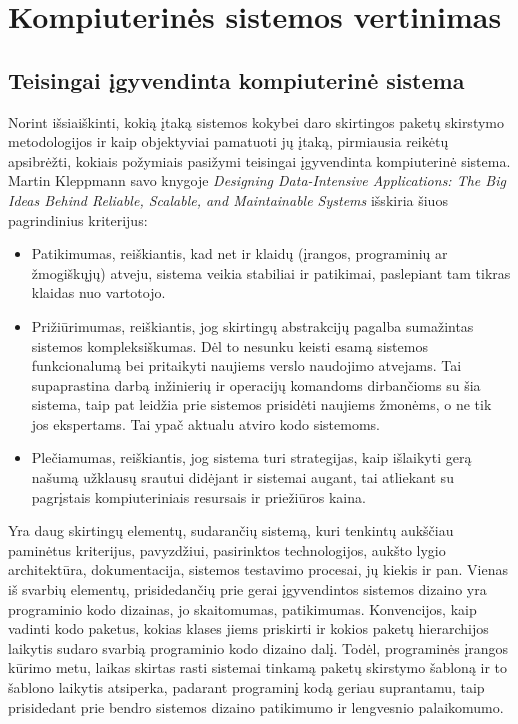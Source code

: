 \section{Kompiuterinės sistemos vertinimas}
\subsection{Teisingai įgyvendinta kompiuterinė sistema}
Norint išsiaiškinti, kokią įtaką sistemos kokybei daro skirtingos paketų skirstymo metodologijos ir kaip objektyviai pamatuoti jų įtaką, pirmiausia
reikėtų apsibrėžti, kokiais požymiais pasižymi teisingai įgyvendinta kompiuterinė sistema.
Martin Kleppmann savo knygoje \textit{Designing Data-Intensive Applications: The Big Ideas Behind Reliable, Scalable, and Maintainable Systems} išskiria šiuos pagrindinius kriterijus:
\begin{itemize}
    \item Patikimumas, reiškiantis, kad net ir klaidų (įrangos, programinių ar žmogiškųjų) atveju,
    sistema veikia stabiliai ir patikimai, paslepiant tam tikras klaidas nuo vartotojo\cite{DataIntensiveApplications}.
    \item Prižiūrimumas, reiškiantis, jog skirtingų abstrakcijų pagalba sumažintas sistemos kompleksiškumas.
    Dėl to nesunku keisti esamą sistemos funkcionalumą bei pritaikyti naujiems verslo naudojimo atvejams.
    Tai supaprastina darbą inžinierių ir operacijų komandoms dirbančioms su šia sistema, taip pat leidžia prie sistemos prisidėti naujiems žmonėms, o ne
    tik jos ekspertams.
    Tai ypač aktualu atviro kodo sistemoms\cite{DataIntensiveApplications}.
    \item Plečiamumas, reiškiantis, jog sistema turi strategijas, kaip išlaikyti gerą našumą užklausų
    srautui didėjant ir sistemai augant, tai atliekant su pagrįstais kompiuteriniais resursais ir
    priežiūros kaina\cite{DataIntensiveApplications}.
\end{itemize}
Yra daug skirtingų elementų, sudarančių sistemą, kuri tenkintų aukščiau paminėtus kriterijus,
pavyzdžiui, pasirinktos technologijos, aukšto lygio architektūra, dokumentacija, sistemos testavimo
procesai, jų kiekis ir pan.
Vienas iš svarbių elementų, prisidedančių prie gerai įgyvendintos sistemos dizaino yra programinio kodo dizainas, jo skaitomumas, patikimumas.
Konvencijos, kaip vadinti kodo paketus, kokias klases jiems priskirti ir kokios paketų hierarchijos laikytis sudaro svarbią programinio kodo dizaino dalį.
Todėl, programinės įrangos kūrimo metu, laikas skirtas rasti sistemai tinkamą paketų skirstymo šabloną ir to šablono laikytis atsiperka, padarant
programinį kodą geriau suprantamu, taip prisidedant prie bendro sistemos dizaino patikimumo ir lengvesnio palaikomumo.

